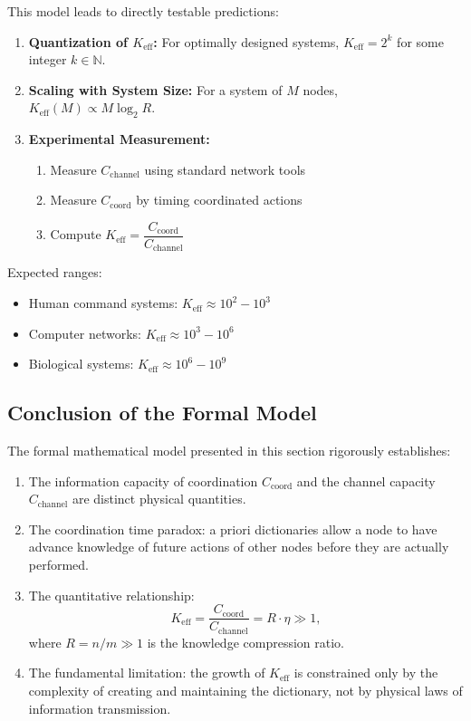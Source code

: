 \documentclass[11pt,a4paper]{article}
\begin{document}
This model leads to directly testable predictions:

\begin{enumerate}
	\item \textbf{Quantization of $K_{\mathrm{eff}}$:} For optimally designed systems, $K_{\mathrm{eff}} = 2^k$ for some integer $k \in \mathbb{N}$.
	
	\item \textbf{Scaling with System Size:} For a system of $M$ nodes, $K_{\mathrm{eff}}(M) \propto M \log_2 R$.
	
	\item \textbf{Experimental Measurement:} 
	\begin{enumerate}
		\item Measure $C_{\text{channel}}$ using standard network tools
		\item Measure $C_{\text{coord}}$ by timing coordinated actions
		\item Compute $K_{\mathrm{eff}} = \dfrac{C_{\text{coord}}}{C_{\text{channel}}}$
	\end{enumerate}
\end{enumerate}

Expected ranges:
\begin{itemize}
	\item Human command systems: $K_{\mathrm{eff}} \approx 10^2 - 10^3$
	\item Computer networks: $K_{\mathrm{eff}} \approx 10^3 - 10^6$
	\item Biological systems: $K_{\mathrm{eff}} \approx 10^6 - 10^9$
\end{itemize}

\subsection{Conclusion of the Formal Model}

The formal mathematical model presented in this section rigorously establishes:

\begin{enumerate}
	\item The information capacity of coordination $C_{\text{coord}}$ and the channel capacity $C_{\text{channel}}$ are distinct physical quantities.
	
	\item The coordination time paradox: a priori dictionaries allow a node to have advance knowledge of future actions of other nodes before they are actually performed.
	
	\item The quantitative relationship:
	\[
	K_{\mathrm{eff}} = \frac{C_{\text{coord}}}{C_{\text{channel}}} = R \cdot \eta \gg 1,
	\]
	where $R = n/m \gg 1$ is the knowledge compression ratio.
	
	\item The fundamental limitation: the growth of $K_{\mathrm{eff}}$ is constrained only by the complexity of creating and maintaining the dictionary, not by physical laws of information transmission.
\end{enumerate}
\end{document}
